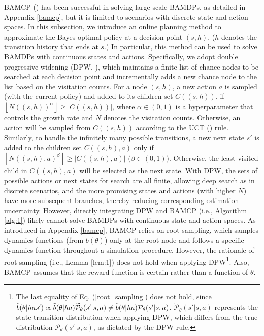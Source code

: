 BAMCP (\cite{DBLP:journals/jair/GuezSD13}) has been successful in solving large-scale BAMDPs, as detailed in Appendix \ref{bamcp}, but it is limited to scenarios with discrete state and action spaces.
In this subsection, we introduce an online planning method to approximate the Bayes-optimal policy at a decision point $(s, h)$. ($h$ denotes the transition history that ends at $s$.) In particular, this method can be used to solve BAMDPs with continuous states and actions. 
Specifically, we adopt double progressive widening (DPW, \cite{DBLP:conf/lion/CouetouxHSTB11, DBLP:conf/pkdd/AugerCT13}), which maintains a finite list of chance nodes to be searched at each decision point and incrementally adds a new chance node to the list based on the visitation counts. For a node $(s, h)$, a new action $a$ is sampled (with the current policy) and added to its children set $C((s, h))$, if $\left \lfloor {N((s, h))^\alpha}\right \rfloor \geq |C((s, h))|$, where $\alpha \in (0, 1)$ is a hyperparameter that controls the growth rate and $N$ denotes the visitation counts. Otherwise, an action will be sampled from $C((s, h))$ according to the UCT (\cite{DBLP:conf/ecml/KocsisS06}) rule. Similarly, to handle the infinitely many possible transitions, a new next state \(s'\) is added to the children set \(C((s, h), a)\) only if \(\left \lfloor {N((s, h), a)^\beta}\right \rfloor \geq |C((s, h), a)|\) (\(\beta \in (0, 1)\)). Otherwise, the least visited child in \(C((s, h), a)\) will be selected as the next state. With DPW, the sets of possible actions or next states for search are all finite, allowing deep search as in discrete scenarios, and the more promising states and actions (with higher $N$) have more subsequent branches, thereby reducing corresponding estimation uncertainty. 
However, directly integrating DPW and BAMCP (i.e., Algorithm \ref{alg:1}) likely cannot solve BAMDPs with continuous state and action spaces. As introduced in Appendix \ref{bamcp}, BAMCP relies on root sampling, which samples dynamics functions (from $b(\theta)$) only at the root node and follows a specific dynamics function throughout a simulation procedure. However, the rationale of root sampling (i.e., Lemma \ref{lem:1}) does not hold when applying DPW\footnote{The last equality of Eq. (\ref{root_sampling}) does not hold, since $\Tilde{b}(\theta|has') \propto \tilde{b}(\theta|ha) \widetilde{\mathcal{P}}_\theta(s'|s, a) \neq \tilde{b}(\theta|ha) \mathcal{P}_\theta(s'|s, a)$. \(\widetilde{\mathcal{P}}_\theta(s'|s, a)\) represents the state transition distribution when applying DPW, which differs from the true distribution \(\mathcal{P}_\theta(s'|s, a)\), as dictated by the DPW rule.}. Also, BAMCP assumes that the reward function is certain rather than a function of $\theta$. 

